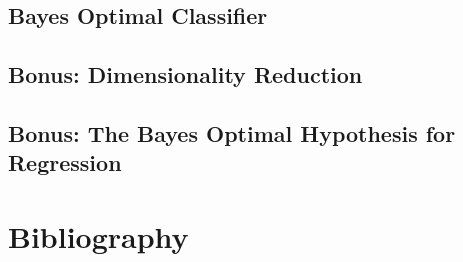 \documentclass[12pt]{article}
\begin{document}
\newpage



\section{Bayes Optimal Classifier}



\section{Bonus: Dimensionality Reduction}


\section{Bonus: The Bayes Optimal Hypothesis for Regression}


\chapter*{Bibliography}
%	



\end{document}
